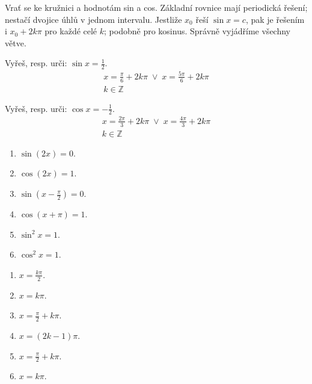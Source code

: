 \documentclass[11pt,a4paper]{article}
\begin{document}
Vrať se ke kružnici a hodnotám sin a cos. Základní rovnice mají periodická řešení; nestačí dvojice úhlů v jednom intervalu.
Jestliže $x_0$ řeší $\sin x=c$, pak je řešením i $x_0+2k\pi$ pro každé celé $k$; podobně pro kosinus. Správně vyjádříme všechny větve.
\begin{prikladReseniBox}[title={Příklad 1}]
Vyřeš, resp. urči: $\sin x=\frac{1}{2}$.
\tcblower
\[\begin{aligned}x=\frac{\pi}{6}+2k\pi\;\lor\;x=\frac{5\pi}{6}+2k\pi \\ k\in\mathbb Z\end{aligned}\]
\end{prikladReseniBox}
\begin{prikladReseniBox}[title={Příklad 2}]
Vyřeš, resp. urči: $\cos x=-\frac{1}{2}$.
\tcblower
\[\begin{aligned}x=\frac{2\pi}{3}+2k\pi\;\lor\;x=\frac{4\pi}{3}+2k\pi \\ k\in\mathbb Z\end{aligned}\]
\end{prikladReseniBox}
\begin{zadaniReseniBox}[title={Samostatná práce 1}]
\begin{enumerate}[label=\alph*)]
\item $\sin(2x)=0$.
\item $\cos(2x)=1$.
\item $\sin(x-\frac{\pi}{2})=0$.
\item $\cos(x+\pi)=1$.
\item $\sin^2x=1$.
\item $\cos^2x=1$.
\end{enumerate}
\tcblower
\begin{enumerate}[label=\alph*)]
\item $x=\frac{k\pi}{2}$.
\item $x=k\pi$.
\item $x=\frac{\pi}{2}+k\pi$.
\item $x=(2k-1)\pi$.
\item $x=\frac{\pi}{2}+k\pi$.
\item $x=k\pi$.
\end{enumerate}
\end{zadaniReseniBox}
\end{document}
